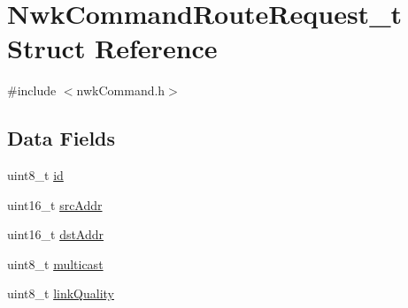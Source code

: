 \hypertarget{struct_nwk_command_route_request__t}{\section{Nwk\-Command\-Route\-Request\-\_\-t Struct Reference}
\label{struct_nwk_command_route_request__t}
}


{\ttfamily \#include $<$nwk\-Command.\-h$>$}

\subsection*{Data Fields}
\begin{DoxyCompactItemize}
\item 
uint8\-\_\-t \hyperlink{struct_nwk_command_route_request__t_af8676c312b3c53d469645952a6979a89}{id}
\item 
uint16\-\_\-t \hyperlink{struct_nwk_command_route_request__t_a47a581bfa6b97c773d12eeba64418657}{src\-Addr}
\item 
uint16\-\_\-t \hyperlink{struct_nwk_command_route_request__t_a801a38c63bb90cec2abf55609cc5e7c2}{dst\-Addr}
\item 
uint8\-\_\-t \hyperlink{struct_nwk_command_route_request__t_a573ae662972add7e9f85fbdfc9259210}{multicast}
\item 
uint8\-\_\-t \hyperlink{struct_nwk_command_route_request__t_a27f2b9f8905690fe4d88c8fe6d7e8ba5}{link\-Quality}
\end{DoxyCompactItemize}


